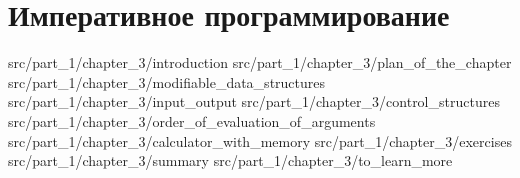 \chapter{Императивное программирование}

 {src/part_1/chapter_3/introduction}
 {src/part_1/chapter_3/plan_of_the_chapter}
 {src/part_1/chapter_3/modifiable_data_structures}
 {src/part_1/chapter_3/input_output}
 {src/part_1/chapter_3/control_structures}
 {src/part_1/chapter_3/order_of_evaluation_of_arguments}
 {src/part_1/chapter_3/calculator_with_memory}
 {src/part_1/chapter_3/exercises}
 {src/part_1/chapter_3/summary}
 {src/part_1/chapter_3/to_learn_more}